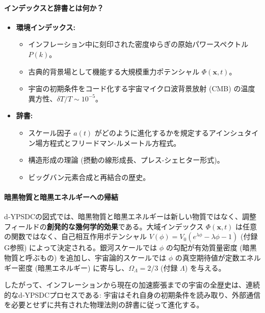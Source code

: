 \documentclass[11pt,a4paper]{article}
\begin{document}
	\paragraph*{インデックスと辞書とは何か？}
	\begin{itemize}[leftmargin=*]
		\item \textbf{環境インデックス:}
		\begin{itemize}
			\item インフレーション中に刻印された密度ゆらぎの原始パワースペクトル $P(k)$。
			\item 古典的背景場として機能する大規模重力ポテンシャル $\Phi(\mathbf{x},t)$。
			\item 宇宙の初期条件をコード化する宇宙マイクロ波背景放射 (CMB) の温度異方性、$\delta T / T \sim 10^{-5}$。
		\end{itemize}
		\item \textbf{辞書:}
		\begin{itemize}
			\item スケール因子 $a(t)$ がどのように進化するかを規定するアインシュタイン場方程式とフリードマン-ルメートル方程式。
			\item 構造形成の理論 (摂動の線形成長、プレス-シェヒター形式)。
			\item ビッグバン元素合成と再結合の歴史。
		\end{itemize}
	\end{itemize}
	
	\paragraph*{暗黒物質と暗黒エネルギーへの帰結}
	d‑YPSDCの図式では、暗黒物質と暗黒エネルギーは新しい物質ではなく、調整フィールドの\textbf{創発的な幾何学的効果}である。大域インデックス $\Phi(\mathbf{x},t)$ は任意の関数ではなく、自己相互作用ポテンシャル $V(\phi) = V_0 (e^{\lambda \phi} - \lambda \phi - 1)$ (付録G参照) によって決定される。銀河スケールでは $\phi$ の勾配が有効質量密度 (暗黒物質と呼ぶもの) を追加し、宇宙論的スケールでは $\phi$ の真空期待値が定数エネルギー密度 (暗黒エネルギー) に寄与し、$\Omega_\Lambda = 2/3$ (付録 $\Lambda$) を与える。
	
	したがって、インフレーションから現在の加速膨張までの宇宙の全歴史は、連続的なd‑YPSDCプロセスである: 宇宙はそれ自身の初期条件を読み取り、外部通信を必要とせずに共有された物理法則の辞書に従って進化する。
	
\end{document}
